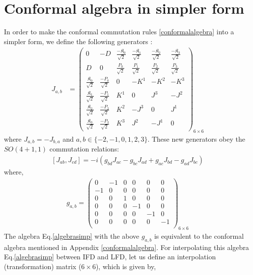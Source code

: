 \documentclass[aps,reprint,notitlepage,nofootinbib,superscriptaddress]{revtex4-1}
\begin{document}
\section{Conformal algebra in simpler form}
\label{conformalsimpler}
In order to make the conformal commutation rules \eqref{conformalalgebra} into a simpler form, we define the following generators \cite{Francesco,Blumenhagen}:
\begin{align}\label{Jab}
  J_{a,b}&=
  \begin{pmatrix}
  0&-D&\frac{-\mathfrak{K}_0}{\sqrt{2}}&\frac{-\mathfrak{K}_1}{\sqrt{2}}&\frac{-\mathfrak{K}_2}{\sqrt{2}}&\frac{-\mathfrak{K}_3}{\sqrt{2}}\\
  D&0&\frac{P_0}{\sqrt{2}}&\frac{P_1}{\sqrt{2}}&\frac{P_2}{\sqrt{2}}&\frac{P_3}{\sqrt{2}}\\
    \frac{\mathfrak{K}_0}{\sqrt{2}}&\frac{-P_0}{\sqrt{2}}&0 & -K^{1} & -K^{2} & -K^{3}\\
    \frac{\mathfrak{K}_1}{\sqrt{2}}&\frac{-P_1}{\sqrt{2}}&K^{1} & 0 & J^{3} & -J^{2}\\
    \frac{\mathfrak{K}_2}{\sqrt{2}}&\frac{-P_2}{\sqrt{2}}&K^{2} & -J^{3} & 0 & J^{1}\\
    \frac{\mathfrak{K}_3}{\sqrt{2}}&\frac{-P_3}{\sqrt{2}}&K^{3} & J^{2} & -J^{1} & 0
  \end{pmatrix}_{6\times6}
\end{align}
where $J_{a,b}=-J_{b,a}$ and $a,b\in\{-2,-1,0,1,2,3\}$. These new generators obey the $SO(4+1,1)$ commutation relations:
  \begin{align}\label{algebrasimp}
      \left[J_{{a}{b}},J_{{c}{d}}\right]=-i\left(g_{{b}{d}}J_{{a}{c}}-g_{{b}{c}}J_{{a}{d}}+g_{{a}{c}}J_{{b}{d}}-g_{{a}{d}}J_{{b}{c}}\right)
  \end{align}
where, 
  \begin{align}\label{metric}
      g_{a,b}=\begin{pmatrix}
  0&-1&0&0&0&0\\
  -1&0&0&0&0&0\\
  0&0&1&0&0&0\\
  0&0&0&-1&0&0\\
  0&0&0&0&-1&0\\
  0&0&0&0&0&-1\\
  \end{pmatrix}_{6\times6}
  \end{align}
The algebra Eq.\eqref{algebrasimp} with the above $g_{a,b}$ is equivalent to the conformal algebra mentioned in Appendix \ref{conformalalgebra}. For interpolating this algebra Eq.\eqref{algebrasimp} between IFD and LFD, let us define an interpolation (transformation) matrix ($6\times6$), which is given by,
\end{document}
